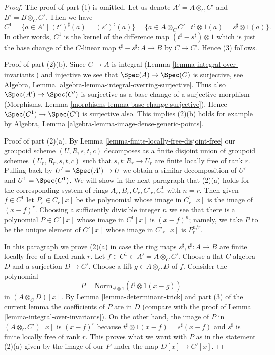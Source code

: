 \begin{proof}
The proof of part (1) is omitted. Let us denote $A' = A \otimes_C C'$ and
$B' = B \otimes_C C'$. Then we have
$$
C^1
= \{a \in A' \mid (t')^\sharp(a) = (s')^\sharp(a) \}
= \{a \in A \otimes_C C' \mid t^\sharp \otimes 1(a) = s^\sharp \otimes 1(a) \}.
$$
In other words, $C^1$ is the kernel of the difference map
$(t^\sharp - s^\sharp) \otimes 1$ which is just the base change
of the $C$-linear map $t^\sharp - s^\sharp : A \to B$ by $C \to C'$.
Hence (3) follows.

\medskip\noindent
Proof of part (2)(b). Since $C \to A$ is integral
(Lemma \ref{lemma-integral-over-invariants}) and injective we see that
$\Spec(A) \to \Spec(C)$ is surjective, see
Algebra, Lemma \ref{algebra-lemma-integral-overring-surjective}.
Thus also $\Spec(A') \to \Spec(C')$ is surjective
as a base change of a surjective morphism
(Morphisms, Lemma \ref{morphisms-lemma-base-change-surjective}).
Hence $\Spec(C^1) \to \Spec(C')$ is surjective also.
This implies (2)(b) holds for example by
Algebra, Lemma \ref{algebra-lemma-image-dense-generic-points}.

\medskip\noindent
Proof of part (2)(a). By Lemma \ref{lemma-finite-locally-free-disjoint-free}
our groupoid scheme $(U, R, s, t, c)$ decomposes as a finite disjoint union
of groupoid schemes $(U_r, R_r, s, t, c)$ such that $s, t : R_r \to U_r$
are finite locally free of rank $r$. Pulling back by $U' = \Spec(A') \to U$
we obtain a similar decomposition of $U'$ and $U^1 = \Spec(C^1)$.
We will show in the next paragraph that (2)(a) holds for the corresponding
system of rings $A_r, B_r, C_r, C'_r, C^1_r$ with $n = r$.
Then given $f \in C^1$ let $P_r \in C_r[x]$ be the polynomial
whose image in $C^1_r[x]$ is the image of $(x - f)^r$.
Choosing a sufficiently divisible integer $n$ we see that
there is a polynomial $P \in C'[x]$ whose image in $C^1[x]$ is
$(x - f)^n$; namely, we take $P$ to be the unique element of
$C'[x]$ whose image in $C'_r[x]$ is $P_r^{n/r}$.

\medskip\noindent
In this paragraph we prove (2)(a) in case the ring maps
$s^\sharp, t^\sharp : A \to B$ are finite locally free of a fixed rank $r$.
Let $f \in C^1 \subset A' = A \otimes_C C'$. Choose a flat
$C$-algebra $D$ and a surjection $D \to C'$. Choose a lift
$g \in A \otimes_C D$ of $f$.
Consider the polynomial
$$
P = \text{Norm}_{s^\sharp \otimes 1}(t^\sharp \otimes 1(x - g))
$$
in $(A \otimes_C D)[x]$. By Lemma \ref{lemma-determinant-trick}
and part (3) of the current lemma the coefficients of $P$ are in $D$
(compare with the proof of Lemma \ref{lemma-integral-over-invariants}).
On the other hand, the image of $P$ in $(A \otimes_C C')[x]$ is
$(x - f)^r$ because $t^\sharp \otimes 1(x - f) = s^\sharp(x - f)$
and $s^\sharp$ is finite locally free of rank $r$.
This proves what we want with $P$ as in the statement (2)(a)
given by the image of our $P$ under the map $D[x] \to C'[x]$.
\end{proof}

